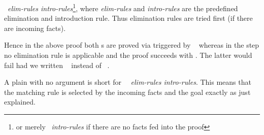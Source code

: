 \begin{isabellebody}
\begin{isamarkuptext}
\begin{itemize}
~\textit{elim-rules intro-rules}\isa{{\isacharparenright}}\footnote{or
merely ~\textit{intro-rules}\isa{{\isacharparenright}} if there are no facts
fed into the proof}, where \textit{elim-rules} and \textit{intro-rules}
are the predefined elimination and introduction rule. Thus
elimination rules are tried first (if there are incoming facts).
\end{itemize}
Hence in the above proof both s are proved via
 triggered by ~ whereas
in the  step no elimination rule is applicable and
the proof succeeds with . The latter would fail had
we written ~ instead of
~.

A plain  with no argument is short for
~~\textit{elim-rules intro-rules}\isa{{\isacharparenright}}\footnotemark[1].
This means that the matching rule is selected by the incoming facts and the goal exactly as just explained.


\end{isamarkuptext}
\end{isabellebody}
